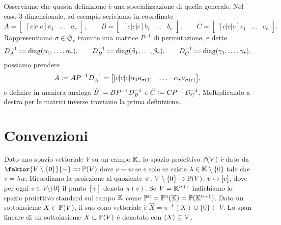\begin{remark}
	Osserviamo che questa definizione è una specializzazione di quella generale. Nel caso $ 3
	$-dimensionale, ad esempio scriviamo in coordinate
	\begin{equation*}
		A = \begin{bmatrix}[c|c|c]
			a_1 & \dots & a_r
		\end{bmatrix},\qquad
		B = \begin{bmatrix}[c|c|c]
			b_1 & \dots & b_r
		\end{bmatrix},\qquad
		C = \begin{bmatrix}[c|c|c]
			c_1 & \dots & c_r
		\end{bmatrix}.
	\end{equation*}
	Rappresentiamo $ \sigma \in \mathfrak{S}_{r} $ tramite una matrice $ P^{-1} $ di permutazione, e dette
	\begin{equation*}
		D_{A}^{-1} \vcentcolon= \operatorname{diag}(\alpha_1, \ldots, \alpha_{r}), \qquad D_{B}^{-1} \vcentcolon= \operatorname{diag}(\beta_1, \ldots,
		\beta_{r}), \qquad D_{C}^{-1} \vcentcolon= \operatorname{diag}(\gamma_1, \ldots, \gamma_{r}),
	\end{equation*}
	possiamo prendere
	\begin{equation*}
		\tilde{A} \defeq A P^{-1}D_{A}^{-1} = \begin{bmatrix}[c|c|c]
			\alpha_1 a_{\sigma(1)} & \dots & \alpha_{r} a_{\sigma(r)}
		\end{bmatrix},
	\end{equation*}
	e definire in maniera analoga $ \tilde{B} \vcentcolon= BP^{-1}D_{B}^{-1}$ e $ \tilde{C} \vcentcolon=
		CP^{-1}D_{C}^{-1} $. Moltiplicando a destra per le matrici inverse troviamo la prima definizione.
\end{remark}

\section{Convenzioni}

Dato uno spazio vettoriale $ V $ su un campo $ \mathbb{K} $, lo spazio proiettivo $ \mathbb{P}(V) $ è dato da $ \faktor{V \setminus \{0\}}{\sim} \eqdef
	\PP(V)$ dove $v \sim w $ se e solo se esiste $ \lambda \in \mathbb{K} \setminus \{0\}  $ tale che $ v
	= \lambda w $. Ricordiamo la proiezione al quoziente $ \pi
	\colon V \setminus \{0\}  \to  \mathbb{P}(V) \colon v \mapsto [v]$, dove per ogni $ v \in V \setminus \{0\}
$ il punto $ [v] $ denota $
	\pi(v) $.
Se $ V = \mathbb{K}^{n+1} $ indichiamo lo spazio proiettivo standard sul campo $ \mathbb{K} $ come $ \mathbb{P}^n = \mathbb{P}^n(\mathbb{K}) =
	\mathbb{P}(\mathbb{K}^{n+1} ) $. Dato un sottoinsieme $ X \subset \mathbb{P}(V) $, il
suo cono vettoriale è $ \hat{X} = \pi^{-1}(X)  \cup \{0\} \subset V$. Lo span lineare di un
sottoinsieme $ X \subset \mathbb{P}(V) $ è denotato con $ \angb{X} \subseteq V $.


